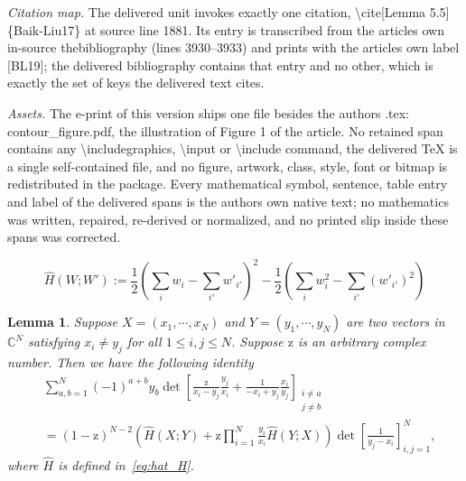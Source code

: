 \documentclass[10pt,a4paper]{amsart}
\newtheorem{lm}[thm]{Lemma}
\newcommand{\complexC}{\mathbb{C}}
\newcommand{\rz}{\mathrm{z}}
\begin{document}
\noindent\textit{Citation map.} The delivered unit invokes exactly one citation, \textbackslash{}cite[Lemma 5.5]\{Baik-Liu17\} at source line 1881. Its entry is transcribed from the article\textquotesingle s own in-source thebibliography (lines 3930--3933) and prints with the article\textquotesingle s own label [BL19]; the delivered bibliography contains that entry and no other, which is exactly the set of keys the delivered text cites.\par
\noindent\textit{Assets.} The e-print of this version ships one file besides the author\textquotesingle s .tex: contour\_figure.pdf, the illustration of Figure 1 of the article. No retained span contains any \textbackslash{}includegraphics, \textbackslash{}input or \textbackslash{}include command, the delivered TeX is a single self-contained file, and no figure, artwork, class, style, font or bitmap is redistributed in the package. Every mathematical symbol, sentence, table entry and label of the delivered spans is the author\textquotesingle s own native text; no mathematics was written, repaired, re-derived or normalized, and no printed slip inside these spans was corrected.\par
\begin{equation}
	\label{eq:hat_H}
	\hat H\left(W;W'\right):= 
	   \frac{1}{2} \left(
	                   \sum_i w_i -\sum_{i'} w'_{i'}  
	               \right)^2
	   -\frac{1}{2} \left(
	                  \sum_i w_i^2 -\sum_{i'} \left(w'_{i'}\right)^2  
	                \right)
\end{equation}

\setcounter{section}{2}
\setcounter{thm}{8}
\begin{lm}
	\label{lem:Cauchy_generalization}
	Suppose $X=(x_1,\cdots,x_N)$ and $Y=(y_1,\cdots,y_N)$ are two vectors in $\complexC^N$ satisfying $x_i\ne y_j$ for all $1\le i,j\le N$. Suppose $\rz$ is an arbitrary complex number. Then we have the following identity
	\begin{equation}
		\label{eq:Cauchy_generalization}
		\begin{split}
		&\sum_{a,b=1}^N (-1)^{a +b}
		   y_b \det\left[ \frac{\rz}{ x_i-y_j} \frac{y_j}{x_i}
		                        +\frac{1}{-x_i+y_j}\frac{x_i}{y_j}   
		                  \right]_{\substack{i\ne a\\ j\ne b}}\\
		                  &
		=(1-\rz)^{N-2}\left(\hat H(X;Y)+\rz\prod_{i=1}^N\frac{y_i}{x_i}\hat H(Y;X)\right)\det\left[\frac{1}{y_j-x_i}\right]_{i,j=1}^N,
		\end{split}
	\end{equation}
where $\hat H$ is defined in~\eqref{eq:hat_H}.
\end{lm}
\end{document}
